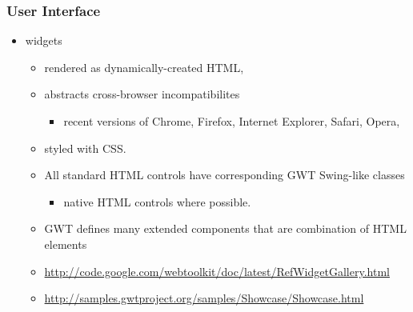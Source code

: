 \documentclass[10pt,table, xcolor=pdflatex]{beamer}
\begin{document}
\begin{frame}\frametitle{User Interface}
	\begin{itemize}
		\item widgets
        \begin{itemize}
        	\item rendered as dynamically-created HTML,
        	\item abstracts cross-browser incompatibilites
              \begin{itemize}
            	\item recent versions of Chrome, Firefox, Internet Explorer, Safari, Opera,
              \end{itemize}
        	\item styled with CSS.
            \item All standard HTML controls have corresponding GWT Swing-like classes
              \begin{itemize}
                \item native HTML controls where possible.
              \end{itemize}
        	
        	\item GWT defines many extended components that are combination of HTML elements
        	\item[] \url{http://code.google.com/webtoolkit/doc/latest/RefWidgetGallery.html}
        	\item[] \url{http://samples.gwtproject.org/samples/Showcase/Showcase.html}
        \end{itemize}
	\end{itemize}
\end{frame}
	
\end{document}
